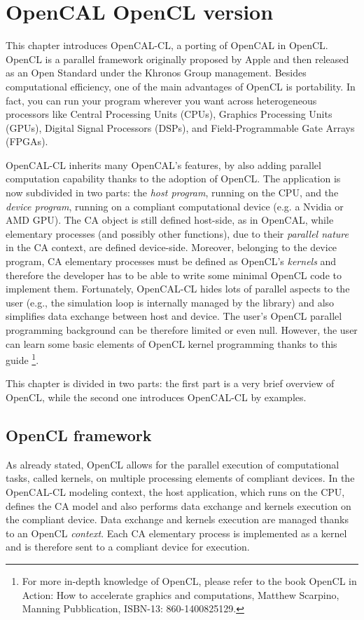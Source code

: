 \chapter{OpenCAL OpenCL version}\label{ch:opencal-cl}


This chapter introduces OpenCAL-CL, a porting of OpenCAL in
OpenCL. OpenCL is a parallel framework originally proposed by Apple
and then released as an Open Standard under the Khronos Group
management. Besides computational efficiency, one of the main
advantages of OpenCL is portability. In fact, you can run your program
wherever you want across heterogeneous processors like Central
Processing Units (CPUs), Graphics Processing Units (GPUs), Digital
Signal Processors (DSPs), and Field-Programmable Gate Arrays (FPGAs).

OpenCAL-CL inherits many OpenCAL's features, by also adding parallel
computation capability thanks to the adoption of OpenCL. The
application is now subdivided in two parts: the \emph{host program},
running on the CPU, and the \emph{device program}, running on a
compliant computational device (e.g. a Nvidia or AMD GPU). The CA
object is still defined host-side, as in OpenCAL, while elementary
processes (and possibly other functions), due to their \textsl{parallel nature} in the CA context, are defined
device-side. Moreover, belonging to the device program, CA elementary processes
must be defined as OpenCL's \emph{kernels} and therefore the developer
has to be able to write some minimal OpenCL code to implement
them. Fortunately, OpenCAL-CL hides lots of parallel aspects to the
user (e.g., the simulation loop is internally managed by the library)
and also simplifies data exchange between host and device. The user's
OpenCL parallel programming background can be therefore limited or
even null. However, the user can learn some basic elements
of OpenCL kernel programming thanks to this guide \footnote{For more in-depth knowledge of OpenCL, please refer to the book OpenCL in Action: How to accelerate graphics and computations, Matthew Scarpino, Manning Pubblication, ISBN-13: 860-1400825129.}.

This chapter is divided in two parts: the first part is a very brief
overview of OpenCL, while the second one introduces OpenCAL-CL by
examples.

\section{OpenCL framework}\label{sec:openclstructure}
As already stated, OpenCL allows for the parallel execution of
computational tasks, called kernels, on multiple processing elements
of compliant devices. In the OpenCAL-CL modeling context, the host
application, which runs on the CPU, defines the CA model and also
performs data exchange and kernels execution on the compliant device.
Data exchange and kernels execution are managed thanks to an OpenCL
\emph{context}. Each CA elementary process is implemented as a kernel
and is therefore sent to a compliant device for execution.

